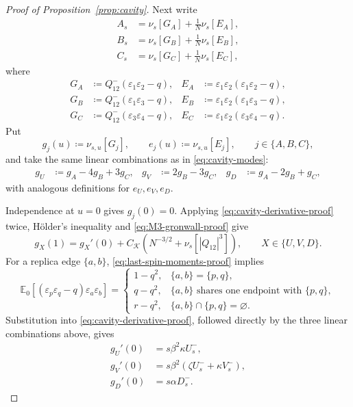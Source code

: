 \documentclass[11pt]{article}
\numberwithin{equation}{section}
\newcommand{\1}{\mathbf 1}
\newcommand{\cK}{\mathcal K}
\begin{document}
\begin{proof}[Proof of Proposition~\ref{prop:cavity}]
Next write
\begin{align}
 A_s&=\nu_s[G_A]+\frac1N\nu_s[E_A],\nonumber\\
 B_s&=\nu_s[G_B]+\frac1N\nu_s[E_B],\nonumber\\
 C_s&=\nu_s[G_C]+\frac1N\nu_s[E_C],
 \label{eq:cavity-decomposition-proof}
\end{align}
where
\begin{align*}
 G_A&\coloneqq Q^-_{12}(\varepsilon_1\varepsilon_2-q),&
 E_A&\coloneqq\varepsilon_1\varepsilon_2
 (\varepsilon_1\varepsilon_2-q),\\
 G_B&\coloneqq Q^-_{12}(\varepsilon_1\varepsilon_3-q),&
 E_B&\coloneqq\varepsilon_1\varepsilon_2
 (\varepsilon_1\varepsilon_3-q),\\
 G_C&\coloneqq Q^-_{12}(\varepsilon_3\varepsilon_4-q),&
 E_C&\coloneqq\varepsilon_1\varepsilon_2
 (\varepsilon_3\varepsilon_4-q).
\end{align*}
Put
\[
 g_j(u)\coloneqq\nu_{s,u}[G_j],
 \qquad
 e_j(u)\coloneqq\nu_{s,u}[E_j],
 \qquad j\in\{A,B,C\},
\]
and take the same linear combinations as in \eqref{eq:cavity-modes}:
\begin{align*}
 g_U&\coloneqq g_A-4g_B+3g_C,&
 g_V&\coloneqq2g_B-3g_C,&
 g_D&\coloneqq g_A-2g_B+g_C,
\end{align*}
with analogous definitions for $e_U,e_V,e_D$.

Independence at $u=0$ gives $g_j(0)=0$.  Applying
\eqref{eq:cavity-derivative-proof} twice, H\"older's inequality and
\eqref{eq:M3-gronwall-proof} give
\begin{equation}
 g_X(1)=g_X'(0)+C_{\cK}(N^{-3/2}+\nu_s[|Q_{12}|^3]),
 \qquad X\in\{U,V,D\}.
 \label{eq:cavity-Taylor-modes}
\end{equation}
For a replica edge $\{a,b\}$, \eqref{eq:last-spin-moments-proof}
implies
\begin{equation}
 \mathbb E_0[(\varepsilon_p\varepsilon_q-q)
 \varepsilon_a\varepsilon_b]
 =
 \begin{cases}
 1-q^2,&\{a,b\}=\{p,q\},\\
 q-q^2,&\{a,b\}\text{ shares one endpoint with }\{p,q\},\\
 r-q^2,&\{a,b\}\cap\{p,q\}=\varnothing.
 \end{cases}
 \label{eq:edge-rule-proof}
\end{equation}
Substitution into \eqref{eq:cavity-derivative-proof}, followed directly
by the three linear combinations above, gives
\begin{align}
 g_U'(0)&=s\beta^2\kappa  U_s^-,\nonumber\\
 g_V'(0)&=s\beta^2(\zeta U_s^-+\kappa V_s^-),
 \label{eq:scalar-first-derivatives}\\
 g_D'(0)&=s\alpha D_s^- .\nonumber
\end{align}



\end{proof}
\end{document}
